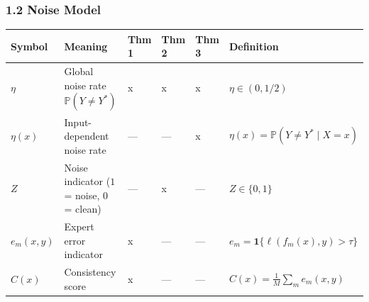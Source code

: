 \documentclass[
  12pt,
]{ctexart}
\begin{document}
\subsubsection{1.2 Noise Model}\label{noise-model}

\begin{longtable}[]{@{}
  >{\raggedright\arraybackslash}p{}
  >{\raggedright\arraybackslash}p{}
  >{\raggedright\arraybackslash}p{}
  >{\raggedright\arraybackslash}p{}
  >{\raggedright\arraybackslash}p{}
  >{\raggedright\arraybackslash}p{}@{}}
\toprule\noalign{}
\begin{minipage}[b]{\linewidth}\raggedright
Symbol
\end{minipage} & \begin{minipage}[b]{\linewidth}\raggedright
Meaning
\end{minipage} & \begin{minipage}[b]{\linewidth}\raggedright
Thm 1
\end{minipage} & \begin{minipage}[b]{\linewidth}\raggedright
Thm 2
\end{minipage} & \begin{minipage}[b]{\linewidth}\raggedright
Thm 3
\end{minipage} & \begin{minipage}[b]{\linewidth}\raggedright
Definition
\end{minipage} \\
\midrule\noalign{}
\endhead
\bottomrule\noalign{}
\endlastfoot
\(\eta\) & Global noise rate \(\mathbb{P}(Y \neq Y^*)\) & x & x & x &
\(\eta \in (0, 1/2)\) \\
\(\eta(x)\) & Input-dependent noise rate & --- & --- & x &
\(\eta(x) = \mathbb{P}(Y \neq Y^* \mid X = x)\) \\
\(Z\) & Noise indicator (\(1\) = noise, \(0\) = clean) & --- & x & --- &
\(Z \in \{0, 1\}\) \\
\(e_m(x, y)\) & Expert error indicator & x & --- & --- &
\(e_m = \mathbf{1}\{\ell(f_m(x), y) > \tau\}\) \\
\(C(x)\) & Consistency score & x & --- & --- &
\(C(x) = \frac{1}{M}\sum_m e_m(x, y)\) \\
\end{longtable}
\end{document}
